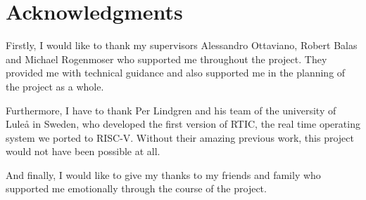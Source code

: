 \chapter*{Acknowledgments}


Firstly, I would like to thank my supervisors Alessandro Ottaviano, Robert Balas and Michael Rogenmoser who supported me throughout the project. They provided me with technical guidance and also supported me in the planning of the project as a whole.

Furthermore, I have to thank Per Lindgren and his team of the university of Luleå in Sweden, who developed the first version of RTIC, the real time operating system we ported to RISC-V. Without their amazing previous work, this project would not have been possible at all.

And finally, I would like to give my thanks to my friends and family who supported me emotionally through the course of the project.